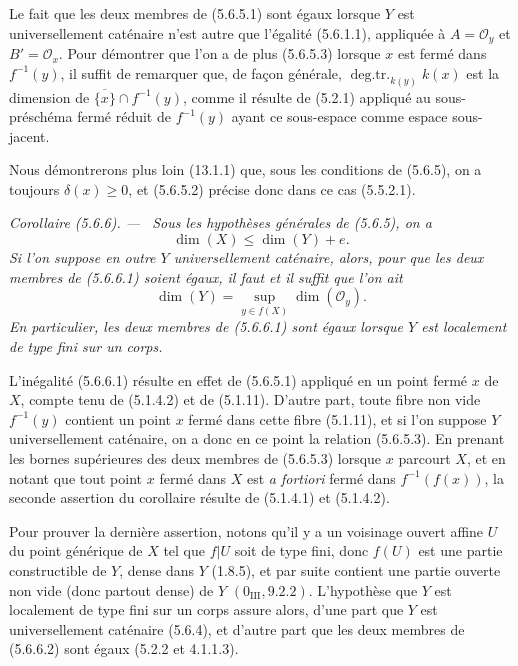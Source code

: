 \documentclass[10pt,oneside]{book}
\newcommand{\oldpage}[2][]{%
  \setcounter{footnote}{0}%
  \marginpar{\scriptsize\textbf{#1}~|~#2}\ignorespaces}
\newenvironment{corollary}[1][]{%
  \par\medskip\noindent\itshape Corollaire (#1). ---\ }{\par}
\begin{document}
Le fait que les deux membres de (5.6.5.1) sont égaux lorsque $Y$ est
universellement caténaire n'est autre que l'égalité (5.6.1.1), appliquée à
$A=\mathcal O_y$ et $B'=\mathcal O_x$. Pour démontrer que l'on a de plus
(5.6.5.3) lorsque $x$ est fermé dans $f^{-1}(y)$, il suffit de remarquer que,
de façon générale, $\operatorname{deg.tr.}_{k(y)}k(x)$ est la dimension de
$\overline{\{x\}}\cap f^{-1}(y)$, comme il résulte de (5.2.1) appliqué au
sous-préschéma fermé réduit de $f^{-1}(y)$ ayant ce sous-espace comme espace
sous-jacent.

\oldpage[IV-2]{100}

Nous démontrerons plus loin (13.1.1) que, sous les conditions de (5.6.5), on
a toujours $\delta(x)\geq0$, et (5.6.5.2) précise donc dans ce cas (5.5.2.1).

\begin{corollary}[5.6.6]
\label{IV.2.s5.6.6-fr}
Sous les hypothèses générales de (5.6.5), on a
\begin{equation}
\dim(X)\leq\dim(Y)+e.
\tag{5.6.6.1}\label{IV.2.s5.6.6.1-fr}
\end{equation}
Si l'on suppose en outre $Y$ universellement caténaire, alors, pour que les
deux membres de (5.6.6.1) soient égaux, il faut et il suffit que l'on ait
\begin{equation}
\dim(Y)=\sup_{y\in f(X)}\dim(\mathcal O_y).
\tag{5.6.6.2}\label{IV.2.s5.6.6.2-fr}
\end{equation}
En particulier, les deux membres de (5.6.6.1) sont égaux lorsque $Y$ est
localement de type fini sur un corps.
\end{corollary}

L'inégalité (5.6.6.1) résulte en effet de (5.6.5.1) appliqué en un point
fermé $x$ de $X$, compte tenu de (5.1.4.2) et de (5.1.11). D'autre part,
toute fibre non vide $f^{-1}(y)$ contient un point $x$ fermé dans cette
fibre (5.1.11), et si l'on suppose $Y$ universellement caténaire, on a donc
en ce point la relation (5.6.5.3). En prenant les bornes supérieures des deux
membres de (5.6.5.3) lorsque $x$ parcourt $X$, et en notant que tout point
$x$ fermé dans $X$ est \emph{a fortiori} fermé dans $f^{-1}(f(x))$, la
seconde assertion du corollaire résulte de (5.1.4.1) et (5.1.4.2).

Pour prouver la dernière assertion, notons qu'il y a un voisinage ouvert
affine $U$ du point générique de $X$ tel que $f|U$ soit de type fini, donc
$f(U)$ est une partie constructible de $Y$, dense dans $Y$ (1.8.5), et par
suite contient une partie ouverte non vide (donc partout dense) de $Y$
$(0_{\mathrm{III}},9.2.2)$. L'hypothèse que $Y$ est localement de type fini
sur un corps assure alors, d'une part que $Y$ est universellement caténaire
(5.6.4), et d'autre part que les deux membres de (5.6.6.2) sont égaux
(5.2.2 et 4.1.1.3).
\end{document}
